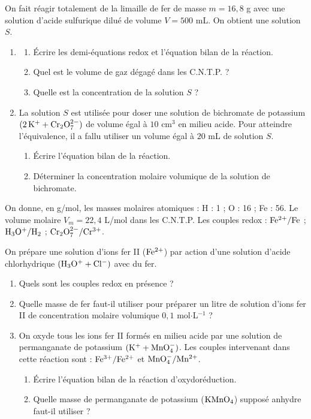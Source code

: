 \documentclass[11pt]{article}
\begin{document}


On fait réagir totalement de la limaille de fer de masse $m = 16{,}8$ g avec une solution d'acide sulfurique dilué de volume $V = 500$ mL. On obtient une solution $S$.

\begin{enumerate}
  \item \begin{enumerate}[label=\alph*.]
    \item Écrire les demi-équations redox et l'équation bilan de la réaction.
    \item Quel est le volume de gaz dégagé dans les C.N.T.P. ?
    \item Quelle est la concentration de la solution $S$ ?
  \end{enumerate}
  \item La solution $S$ est utilisée pour doser une solution de bichromate de potassium $(2\,\mathrm{K^+} + \mathrm{Cr_2O_7^{2-}})$ de volume égal à $10$ cm$^3$ en milieu acide. Pour atteindre l'équivalence, il a fallu utiliser un volume égal à $20$ mL de solution $S$.
  \begin{enumerate}[label=\alph*.]
    \item Écrire l'équation bilan de la réaction.
    \item Déterminer la concentration molaire volumique de la solution de bichromate.
  \end{enumerate}
\end{enumerate}

\noindent On donne, en g/mol, les masses molaires atomiques : H : 1 ; O : 16 ; Fe : 56. Le volume molaire $V_m = 22{,}4$ L/mol dans les C.N.T.P. Les couples redox : $\mathrm{Fe^{2+}/Fe}$ ; $\mathrm{H_3O^+/H_2}$ ; $\mathrm{Cr_2O_7^{2-}/Cr^{3+}}$.

On prépare une solution d'ions fer II ($\mathrm{Fe^{2+}}$) par action d'une solution d'acide chlorhydrique $(\mathrm{H_3O^+} + \mathrm{Cl^-})$ avec du fer.

\begin{enumerate}
  \item Quels sont les couples redox en présence ?
  \item Quelle masse de fer faut-il utiliser pour préparer un litre de solution d'ions fer II de concentration molaire volumique $0{,}1$ mol$\cdot$L$^{-1}$ ?
  \item On oxyde tous les ions fer II formés en milieu acide par une solution de permanganate de potassium $(\mathrm{K^+} + \mathrm{MnO_4^-})$. Les couples intervenant dans cette réaction sont : $\mathrm{Fe^{3+}/Fe^{2+}}$ et $\mathrm{MnO_4^-/Mn^{2+}}$.
  \begin{enumerate}[label=\alph*.]
    \item Écrire l'équation bilan de la réaction d'oxydoréduction.
    \item Quelle masse de permanganate de potassium ($\mathrm{KMnO_4}$) supposé anhydre faut-il utiliser ?
  \end{enumerate}
\end{enumerate}
\end{document}
